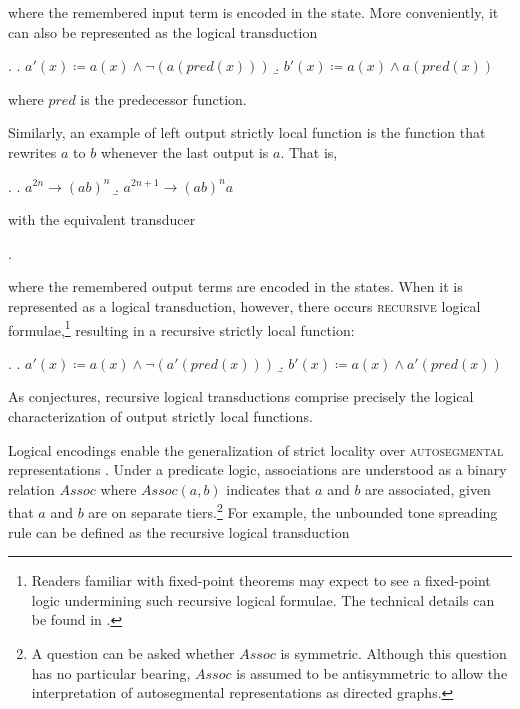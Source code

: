 \documentclass[12pt, a4paper]{report}
\newcommand{\textterm}[1]{\textsc{#1}\index{#1}}
\begin{document}
where the remembered input term is encoded in the state.  More
conveniently, it can also be represented as the logical transduction

\ex.
\a. \(a'(x) \coloneq a(x) \land \neg(a(\mathit{pred}(x)))\)
\b. \(b'(x) \coloneq a(x) \land a(\mathit{pred}(x))\)

where \(\mathit{pred}\) is the predecessor function.

Similarly, an example of left output strictly local function is the
function that rewrites \(a\) to \(b\) whenever the last output is
\(a\).  That is,

\ex.
\a. \(a^{2n} \to (ab)^{n}\)
\b. \(a^{2n+1} \to (ab)^{n}a\)

with the equivalent transducer

\ex.

where the remembered output terms are encoded in the states.  When it
is represented as a logical transduction, however, there occurs
\textterm{recursive} logical formulae,\footnote{Readers familiar with
  fixed-point theorems may expect to see a fixed-point logic
  undermining such recursive logical formulae.  The technical details
  can be found in \textcite{koj18taolns, cj19qlfpfp}.} resulting in a
recursive strictly local function:

\ex.
\a. \(a'(x) \coloneq a(x) \land \neg(a'(\mathit{pred}(x)))\)
\b. \(b'(x) \coloneq a(x) \land a'(\mathit{pred}(x))\)

As \textcite{cj21iolr} conjectures, recursive logical transductions
comprise precisely the logical characterization of output strictly
local functions.

Logical encodings enable the generalization of strict locality over
\textterm{autosegmental} representations \parencite{cj19aislf}.  Under
a predicate logic, associations are understood as a binary relation
\(\mathit{Assoc}\) where \(\mathit{Assoc}(a, b)\) indicates that \(a\)
and \(b\) are associated, given that \(a\) and \(b\) are on separate
tiers.\footnote{A question can be asked whether \(\mathit{Assoc}\) is
  symmetric.  Although this question has no particular bearing,
  \(\mathit{Assoc}\) is assumed to be antisymmetric to allow the
  interpretation of autosegmental representations as directed graphs.}
For example, the unbounded tone spreading rule can be defined as the
recursive logical transduction
\end{document}

